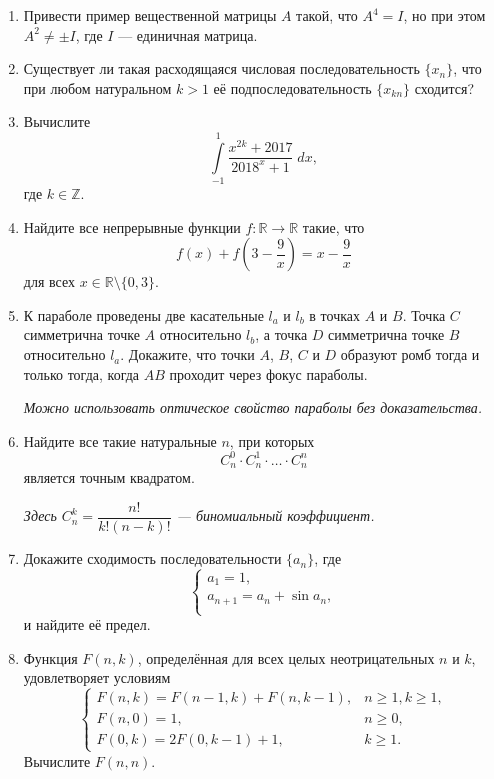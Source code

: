 \begin{enumerate}
\item Привести пример вещественной матрицы $A$ такой, что $A^4 = I$, но при этом $A^2 \neq \pm I$, где $I$ --- единичная матрица.

\item Существует ли такая расходящаяся числовая последовательность $\{x_n\}$, что при любом натуральном $k > 1$ её подпоследовательность $\{x_{kn}\}$ сходится?

\item Вычислите
$$
\int\limits_{-1}^{1} \frac{x^{2k} + 2017}{2018^x + 1} \;dx ,
$$
где $k\in\mathbb Z$.

\item Найдите все непрерывные функции $f: \mathbb{R} \to \mathbb{R}$ такие, что 
$$f(x) + f\left(3 - \frac{9}{x}\right) = x - \frac{9}{x}$$
для всех $x\in\mathbb R\setminus\{0, 3\}.$

\item К параболе проведены две касательные $l_a$ и $l_b$ в точках $A$ и $B$. Точка $C$ симметрична точке $A$ относительно $l_b$, а точка $D$ симметрична точке $B$ относительно $l_a$. Докажите, что точки $A$, $B$, $C$ и $D$ образуют ромб тогда и только тогда, когда $AB$ проходит через фокус параболы.

\textit{Можно использовать оптическое свойство параболы без доказательства.}

\item Найдите все такие натуральные $n$, при которых 
$$C_{n}^0 \cdot C_{n}^1 \cdot \hdots \cdot C_n^n$$
является точным квадратом.

\textit{Здесь $C_n^k = \dfrac{n!}{k!(n-k)!}$ --- биномиальный коэффициент.}

\item Докажите сходимость последовательности $\{a_n\}$, где 
$$
\begin{cases}
a_1 = 1,\\
a_{n+1} = a_n + \sin{a_n},\\
\end{cases}
$$
и найдите её предел.

\item Функция $F(n, k)$, определённая для всех целых неотрицательных $n$ и $k$, удовлетворяет условиям
$$
\begin{cases}
F(n, k) = F(n - 1, k) + F(n, k - 1), & n \geqslant 1, k \geqslant 1,\\
F(n, 0) = 1,  & n \geqslant 0,\\
F(0, k) = 2 F(0, k - 1) + 1, & k \geqslant 1.
\end{cases}
$$
Вычислите $F(n, n)$.
\end{enumerate}